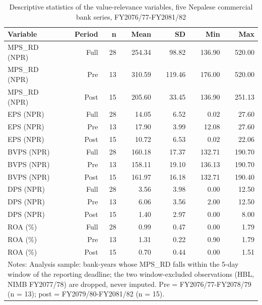 \begin{table}[htbp]
\centering
\caption{Descriptive statistics of the value-relevance variables, five Nepalese commercial bank series, FY2076/77-FY2081/82}
\label{tab:t1_descriptives}
\begin{tabular}{lrrrrrr}
\toprule
Variable & Period & n & Mean & SD & Min & Max \\
\midrule
MPS\_RD (NPR) & Full & 28 & 254.34 & 98.82 & 136.90 & 520.00 \\
MPS\_RD (NPR) & Pre & 13 & 310.59 & 119.46 & 176.00 & 520.00 \\
MPS\_RD (NPR) & Post & 15 & 205.60 & 33.45 & 136.90 & 251.13 \\
EPS (NPR) & Full & 28 & 14.05 & 6.52 & 0.02 & 27.60 \\
EPS (NPR) & Pre & 13 & 17.90 & 3.99 & 12.08 & 27.60 \\
EPS (NPR) & Post & 15 & 10.72 & 6.53 & 0.02 & 22.06 \\
BVPS (NPR) & Full & 28 & 160.18 & 17.37 & 132.71 & 190.70 \\
BVPS (NPR) & Pre & 13 & 158.11 & 19.10 & 136.13 & 190.70 \\
BVPS (NPR) & Post & 15 & 161.97 & 16.18 & 132.71 & 190.40 \\
DPS (NPR) & Full & 28 & 3.56 & 3.98 & 0.00 & 12.50 \\
DPS (NPR) & Pre & 13 & 6.06 & 3.56 & 2.00 & 12.50 \\
DPS (NPR) & Post & 15 & 1.40 & 2.97 & 0.00 & 8.00 \\
ROA (\%) & Full & 28 & 0.99 & 0.47 & 0.00 & 1.79 \\
ROA (\%) & Pre & 13 & 1.31 & 0.22 & 0.90 & 1.79 \\
ROA (\%) & Post & 15 & 0.70 & 0.44 & 0.00 & 1.51 \\
\midrule
\multicolumn{7}{l}{\footnotesize Notes: Analysis sample: bank-years whose MPS\_RD falls within the 5-day window of the reporting deadline; the two window-excluded observations (HBL, NIMB FY2077/78) are dropped, never imputed. Pre = FY2076/77-FY2078/79 (n = 13); post = FY2079/80-FY2081/82 (n = 15).} \\
\bottomrule
\end{tabular}
\end{table}
